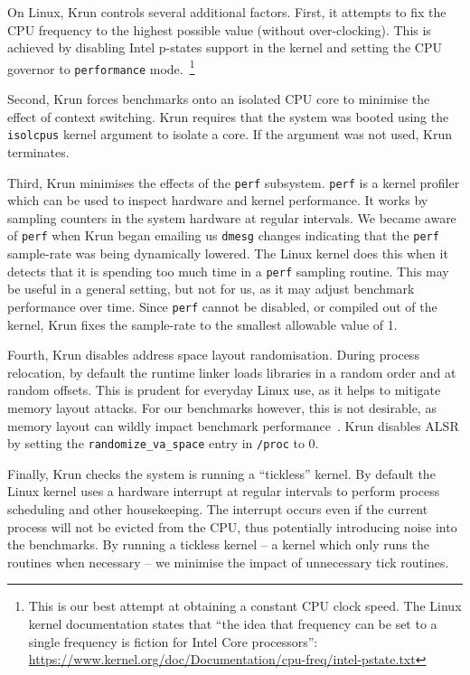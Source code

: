 \documentclass[10pt,preprint]{sigplanconf}
\newcommand{\krun}{Krun\xspace}
\begin{document}
On Linux, \krun controls several additional factors.
First, it attempts to fix the CPU frequency to the highest
possible value (without over-clocking). This is achieved by disabling Intel
p-states support in the kernel and setting the CPU governor to \texttt{performance}
mode.~\footnote{This is our best attempt at obtaining a constant CPU clock
speed. The Linux kernel documentation states that ``the idea that frequency can
be set to a single frequency is fiction for Intel Core
processors'':
\url{https://www.kernel.org/doc/Documentation/cpu-freq/intel-pstate.txt}}

Second, \krun forces benchmarks onto an isolated CPU core to minimise the
effect of context switching. \krun requires that the system was booted using
the \texttt{isolcpus} kernel argument to isolate a core. If the argument was
not used, \krun terminates.

Third, \krun minimises the effects of the \texttt{perf} subsystem.
\texttt{perf} is a kernel profiler which can be used to inspect hardware and
kernel performance. It works by sampling counters in the system hardware at
regular intervals. We became aware of \texttt{perf} when \krun began emailing
us \texttt{dmesg} changes indicating that the \texttt{perf} sample-rate was
being dynamically lowered. The Linux kernel does this when it detects that it
is spending too much time in a \texttt{perf} sampling routine. This may
be useful in a general setting, but not for us, as it may adjust benchmark
performance over time. Since \texttt{perf} cannot be disabled, or compiled out
of the kernel, \krun fixes the sample-rate to the smallest allowable value of
1.

Fourth, \krun disables address space layout randomisation. During process
relocation, by default the runtime linker loads libraries in a random order and
at random offsets. This is prudent for everyday Linux use, as it helps to
mitigate memory layout attacks. For our benchmarks however, this is not
desirable, as memory layout can wildly impact benchmark
performance~\cite{xxx}. \krun disables
ALSR by setting the \texttt{randomize\_va\_space} entry in \texttt{/proc} to 0.

Finally, \krun checks the system is running a ``tickless'' kernel. By default
the Linux kernel uses a hardware interrupt at regular intervals to perform
process scheduling and other housekeeping. The interrupt occurs even if the
current process will not be evicted from the CPU, thus potentially introducing
noise into the benchmarks. By running a tickless kernel -- a kernel which only
runs the routines when necessary -- we minimise the impact of unnecessary tick
routines.
\end{document}
